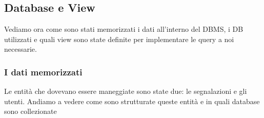         \subsection{Database e View}
            Vediamo ora come sono stati memorizzati i dati all'interno del
            DBMS, i DB utilizzati e quali view sono state definite per
            implementare le query a noi necessarie.

            \subsubsection{I dati memorizzati}
                Le entità che dovevano essere maneggiate sono state due: le
                segnalazioni e gli utenti. Andiamo a vedere come sono
                strutturate queste entità e in quali database sono collezionate

